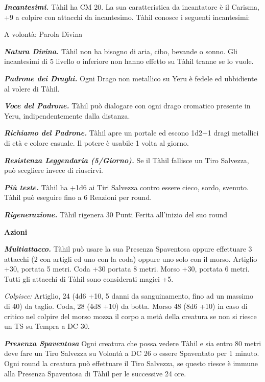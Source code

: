 \begin{multicols}{2}
	\textit{\textbf{Incantesimi.}} Tàhil ha CM 20. La sua caratteristica da incantatore è il Carisma, +9 a colpire con attacchi da incantesimo. Tàhil conosce i seguenti incantesimi:

	A volontà: Parola Divina

	\textit{\textbf{Natura Divina.}} Tàhil non ha bisogno di aria, cibo, bevande o sonno. Gli incantesimi di 5 livello o inferiore non hanno effetto su Tàhil tranne se lo vuole.

	\textit{\textbf{Padrone dei Draghi.}} Ogni Drago non metallico su Yeru è fedele ed ubbidiente al volere di Tàhil.

	\textit{\textbf{Voce del Padrone.}} Tàhil può dialogare con ogni drago cromatico presente in Yeru, indipendentemente dalla distanza.

	\textit{\textbf{Richiamo del Padrone.}} Tàhil apre un portale ed escono 1d2+1 dragi metallici di età e colore casuale. Il potere è usabile 1 volta al giorno.

	\textit{\textbf{Resistenza Leggendaria (5/Giorno).}} Se il Tàhil fallisce un Tiro Salvezza, può scegliere invece di riuscirvi.

	\textit{\textbf{Più teste.}} Tàhil ha +1d6 ai Tiri Salvezza contro essere cieco, sordo, svenuto. Tàhil può eseguire fino a 6 Reazioni per round.

	\textit{\textbf{Rigenerazione.}} Tàhil rigenera 30 Punti Ferita all'inizio del suo round

	\textbf{Azioni}

	\textit{\textbf{Multiattacco.}} Tàhil può usare la sua Presenza Spaventosa oppure effettuare 3 attacchi (2 con artigli ed uno con la coda) oppure uno solo con il morso. Artiglio +30, portata 5 metri. Coda +30 portata 8 metri. Morso +30, portata 6 metri. Tutti gli attacchi di Tàhil sono considerati magici +5.

	\textit{Colpisce:} Artiglio, 24 (4d6 +10, 5 danni da sanguinamento, fino ad un massimo di 40) da taglio. Coda, 28 (4d8 +10) da botta. Morso 48 (8d6 +10) in caso di critico nel colpire del morso mozza il corpo a metà della creatura se non si riesce un TS su Tempra a DC 30.

	\textit{\textbf{Presenza Spaventosa}} Ogni creatura che possa vedere Tàhil e sia entro 80 metri deve fare un Tiro Salvezza su Volontà a DC 26 o essere Spaventato per 1 minuto. Ogni round la creatura può effettuare il Tiro Salvezza, se questo riesce è immune alla Presenza Spaventosa di Tàhil per le successive 24 ore.


\end{multicols}
